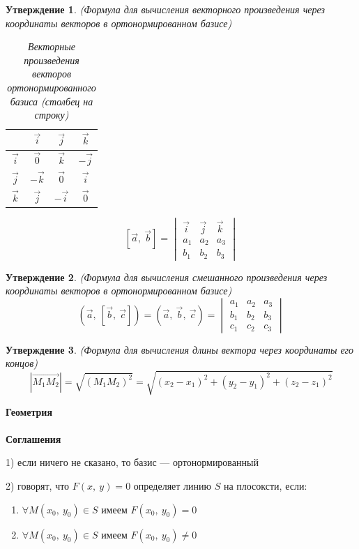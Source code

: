 \documentclass{article}
\newtheorem{statement}{Утверждение}[section]
\theoremstyle{definition}
\begin{document}
\begin{statement}{(Формула для вычисления векторного произведения через координаты векторов в ортонормированном базисе)}

\begin{table}[H]
    \centering
    \begin{tabular}{c|c|c|c}
          $\quad$  &  $\vec i$ & $ \vec j$ & $ \vec k$ \\\hline
          $\vec i$ & $ \vec 0$ & $ \vec k$ & $-\vec j$ \\\hline
          $\vec j$ & $-\vec k$ & $ \vec 0$ & $ \vec i$ \\\hline
          $\vec k$ & $ \vec j$ & $-\vec i$ & $ \vec 0$
    \end{tabular}
    \caption{Векторные произведения векторов ортонормированного базиса (столбец на строку)}
    \label{tab:vec_pow}
\end{table}

$$[\vec a,\ \vec b] = \begin{vmatrix}
\vec i & \vec j & \vec k \\
a_1 & a_2 & a_3 \\
b_1 & b_2 & b_3
\end{vmatrix} $$
\end{statement}

\begin{statement}{(Формула для вычисления смешанного произведения через координаты векторов в ортонормированном базисе)}
$$(\vec a,\ [\vec b,\ \vec c]) = (\vec a,\ \vec b,\ \vec c) = 
\begin{vmatrix}
a_1 & a_2 & a_3 \\
b_1 & b_2 & b_3 \\
c_1 & c_2 & c_3 
\end{vmatrix}$$
\end{statement}

\begin{statement}{(Формула для вычисления длины вектора через координаты его концов)}
$$|\overrightarrow{M_1M_2}| = \sqrt{(M_1M_2)^2} = \sqrt{(x_2 - x_1)^2 + (y_2 - y_1)^2 + (z_2 - z_1)^2}$$
\end{statement}

 
\textbf{\Huge Геометрия}
\\
\\
\textbf{Соглашения}

1) если ничего не сказано, то базис --- ортонормированный 

2) говорят, что $F(x,\ y) = 0$ определяет линию $S$ на плосоксти, если:
\begin{enumerate}
    \item $\forall M(x_0,\ y_0)\in S$ имеем $F(x_0,\ y_0)  =   0$
    \item $\forall M(x_0,\ y_0)\in S$ имеем $F(x_0,\ y_0) \neq 0$
\end{enumerate}
\end{document}
